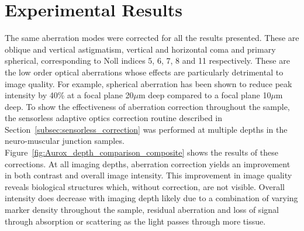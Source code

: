 \section{Experimental Results}
\label{sec:Aurox_results}

The same aberration modes were corrected for all the results presented. 
These are oblique and vertical astigmatism, vertical and horizontal coma 
and primary spherical, corresponding to Noll indices 5, 6, 7, 8 and 11 
respectively\cite{noll1976zernike}. These are the low order optical 
aberrations whose effects are particularly detrimental to image quality. For example, 
spherical aberration has been shown to reduce peak intensity by 40\% at
a focal plane 20$\mu$m deep compared to a focal plane 10$\mu$m 
deep\cite{hell1993aberrations}. To show the effectiveness of aberration 
correction throughout the sample, the sensorless adaptive optics correction
routine described in Section~\ref{subsec:sensorless_correction} was performed
at multiple depths in the neuro-muscular junction samples. Figure~\ref{fig:Aurox_depth_comparison_composite} shows the results of 
these corrections. At all imaging depths, aberration correction yields an 
improvement in both contrast and overall image intensity. This improvement 
in image quality reveals biological structures which, without correction, 
are not visible. Overall intensity does decrease with imaging depth likely 
due to a combination of varying marker density throughout the sample, 
residual aberration and loss of signal through absorption or scattering 
as the light passes through more tissue.

